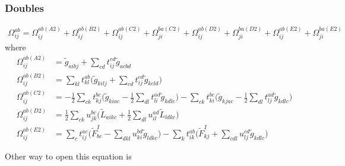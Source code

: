\subsubsection{Doubles}
\hypertarget{sec:ccsd_res_doub}{}
\label{sec:ccsd_res_doub}

\begin{equation}
  \begin{split}
    \Omega_{ij}^{ab}=\Omega_{ij}^{ab(A2)}+\Omega_{ij}^{ab(B2)}+\Omega_{ij}^{ab(C2)}+\Omega_{ji}^{ba(C2)}+\Omega_{ij}^{ab(D2)}+\Omega_{ji}^{ba(D2)}+\Omega_{ij}^{ab(E2)}+\Omega_{ji}^{ba(E2)}
  \end{split}
\end{equation}
where
\begin{align}
  \Omega_{ij}^{ab(A2)}&={\tilde g}_{aibj}+\sum_{cd}t_{ij}^{cd}{\tilde g}_{acbd}\\
  \Omega_{ij}^{ab(B2)}&=\sum_{kl}t_{kl}^{ab}\bigg({\tilde g}_{kilj}+\sum_{cd}t_{ij}^{cd}{\tilde g}_{kcld}\bigg)\\
  \Omega_{ij}^{ab(C2)}&=-\frac{1}{2}\sum_{ck}t_{kj}^{bc}\bigg({\tilde g}_{kiac}-\frac{1}{2}\sum_{dl}t_{li}^{ad}{\tilde g}_{kdlc}\bigg)-\sum_{ck}t_{ki}^{bc}\bigg({\tilde g}_{kjac}-\frac{1}{2}\sum_{dl}t_{lj}^{ad}{\tilde g}_{kdlc}\bigg)\\
  \Omega_{ij}^{ab(D2)}&=\frac{1}{2}\sum_{ck}u_{jk}^{bc}\bigg({\tilde L}_{aikc}+\frac{1}{2}\sum_{dl}u_{il}^{ad}{\tilde L}_{ldkc}\bigg)\\
  \Omega_{ij}^{ab(E2)}&=\sum_{c}t_{ij}^{ac}\bigg({\tilde F}_{bc}^{I}-\sum_{dkl}u_{ki}^{bd}{\tilde g}_{ldkc}\bigg)-\sum_{k}t_{ik}^{ab}\bigg({\tilde F}_{kj}^{I}+\sum_{cdl}u_{lj}^{cd}{\tilde g}_{kdlc}\bigg)
\end{align}


Other way to open this equation is

